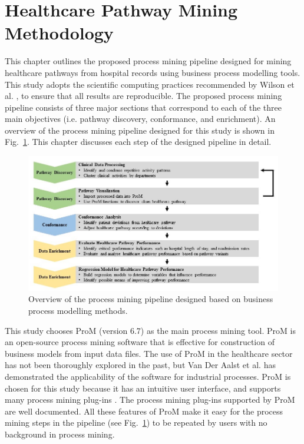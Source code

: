 \documentclass{elsarticle}
\begin{document}
\section{Healthcare Pathway Mining Methodology}
This chapter outlines the proposed process mining pipeline designed for mining healthcare pathways from hospital records using business process modelling tools. This study adopts the scientific computing practices recommended by Wilson et al. \cite{Wilson2014}, \cite{Wilson2017} to ensure that all results are reproducible. The proposed process mining pipeline consists of three major sections that correspond to each of the three main objectives (i.e. pathway discovery, conformance, and enrichment). An overview of the process mining pipeline designed for this study is shown in Fig.~\ref{fig:pipeline}. This chapter discusses each step of the designed pipeline in detail.

\begin{figure}[t]
\centering
\includegraphics[width=\textwidth]{images/pipeline_diagram_journal.jpg}
\caption{Overview of the process mining pipeline designed based on business process modelling methods.}
\label{fig:pipeline}
\end{figure}

This study chooses ProM (version 6.7) as the main process mining tool. ProM is an open-source process mining software that is effective for construction of business models from input data files. The use of ProM in the healthcare sector has not been thoroughly explored in the past, but Van Der Aalst et al. \cite{VanDerAalst2007} has demonstrated the applicability of the software for industrial processes. ProM is chosen for this study because it has an intuitive user interface, and supports many process mining plug-ins \cite{VanDongen2005}. The process mining plug-ins supported by ProM are well documented. All these features of ProM make it easy for the process mining steps in the pipeline (see Fig.~\ref{fig:pipeline}) to be repeated by users with no background in process mining.
\end{document}
